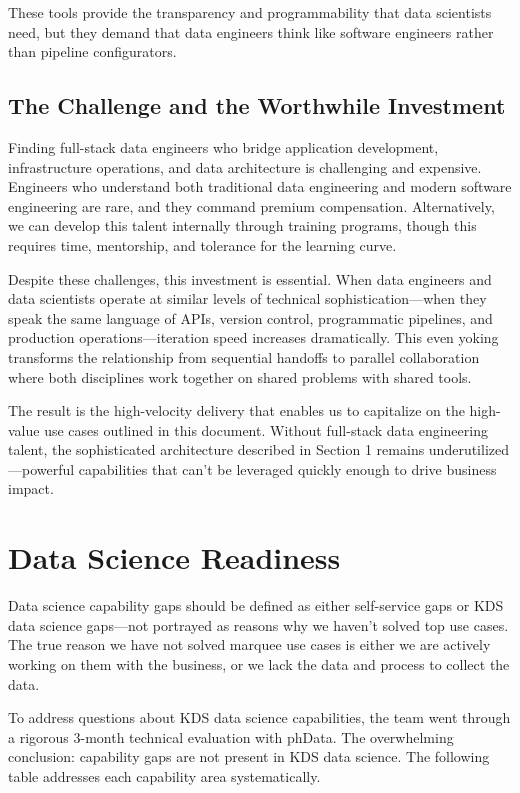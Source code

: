 \documentclass[12pt, a4paper]{article}
\begin{document}
These tools provide the transparency and programmability that data scientists need, but they demand that data engineers think like software engineers rather than pipeline configurators.

\subsection{The Challenge and the Worthwhile Investment}

Finding full-stack data engineers who bridge application development, infrastructure operations, and data architecture is challenging and expensive. Engineers who understand both traditional data engineering and modern software engineering are rare, and they command premium compensation. Alternatively, we can develop this talent internally through training programs, though this requires time, mentorship, and tolerance for the learning curve.

Despite these challenges, this investment is essential. When data engineers and data scientists operate at similar levels of technical sophistication—when they speak the same language of APIs, version control, programmatic pipelines, and production operations—iteration speed increases dramatically. This even yoking transforms the relationship from sequential handoffs to parallel collaboration where both disciplines work together on shared problems with shared tools.

The result is the high-velocity delivery that enables us to capitalize on the high-value use cases outlined in this document. Without full-stack data engineering talent, the sophisticated architecture described in Section 1 remains underutilized—powerful capabilities that can't be leveraged quickly enough to drive business impact.

\section{Data Science Readiness}

Data science capability gaps should be defined as either self-service gaps or KDS data science gaps—not portrayed as reasons why we haven't solved top use cases. The true reason we have not solved marquee use cases is either we are actively working on them with the business, or we lack the data and process to collect the data.

To address questions about KDS data science capabilities, the team went through a rigorous 3-month technical evaluation with phData. The overwhelming conclusion: capability gaps are not present in KDS data science. The following table addresses each capability area systematically.
\end{document}

